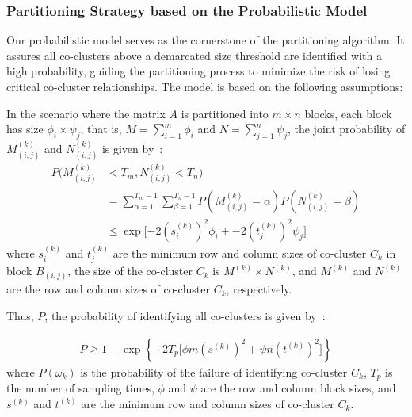 \documentclass[journal]{IEEEtran}
\theoremstyle{definition}
\theoremstyle{remark} %
\begin{document}
\subsubsection{Partitioning Strategy based on the Probabilistic Model}

Our probabilistic model serves as the cornerstone of the partitioning algorithm. It assures all co-clusters above a demarcated size threshold are identified with a high probability, guiding the partitioning process to minimize the risk of losing critical co-cluster relationships. The model is based on the following assumptions:

In the scenario where the matrix $A$ is partitioned into $m \times n$ blocks, each block has size $\phi_i \times \psi_j$, that is, $M=\sum_{i=1}^m \phi_i$ and $N=\sum_{j=1}^n \psi_j$, the joint probability of $M_{(i,j)}^{(k)}$ and $N_{(i,j)}^{(k)}$ is given by~:
\begin{equation}
    \begin{split}
        P(M_{(i,j)}^{(k)} & < T_m, N_{(i,j)}^{(k)} < T_n)                                                                           \\
                          & = \sum_{\alpha=1}^{T_m-1} \sum_{\beta=1}^{T_n-1} P(M_{(i,j)}^{(k)} = \alpha) P(N_{(i,j)}^{(k)} = \beta) \\
                          & \le \exp[-2 (s_i^{(k)})^2 \phi_i + -2 (t_j^{(k)})^2 \psi_j\rbrack
    \end{split}
\end{equation}
where $s_i^{(k)}$ and $t_j^{(k)}$ are the minimum row and column sizes of co-cluster $C_k$ in block $B_{(i,j)}$, the size of the co-cluster $C_k$ is $M^{(k)} \times N^{(k)}$, and $M^{(k)}$ and $N^{(k)}$ are the row and column sizes of co-cluster $C_k$, respectively.

Thus, $P$, the probability of identifying all co-clusters is given by~:

\begin{equation}
    \begin{split}
        P \ge 1 - \exp \left\{ -2 T_p \lbrack \phi m (s^{(k)})^2 + \psi n (t^{(k)})^2\rbrack  \right\} \label{eq:prob-of-identifying-all-co-clusters-sec}
    \end{split}
\end{equation}
where $P(\omega_k)$ is the probability of the failure of identifying co-cluster $C_k$, $T_p$ is the number of sampling times, $\phi$ and $\psi$ are the row and column block sizes, and $s^{(k)}$ and $t^{(k)}$ are the minimum row and column sizes of co-cluster $C_k$.
\end{document}
